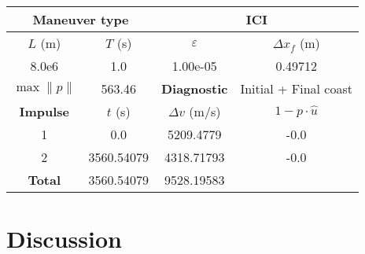     
\begin{table}[htpb]
    \centering
    \begin{tabular}{cccc} \toprule
    \multicolumn{2}{c}{\textbf{Maneuver type}} & \multicolumn{2}{c}{ICI} \\ \midrule
    \(L\) (m) & \(T\) (s) & \(\varepsilon\) & \(\Delta x_{f}\) (m)    \\ \midrule
    8.0e6          & 1.0          & 1.00e-05                & 0.49712                        \\ \midrule
    \(\max \lVert p \rVert\) & 563.46     & \textbf{Diagnostic}   & Initial + Final coast        \\ \midrule
    \textbf{Impulse} & \(t\) (s) & \(\Delta v\) (m/s) & \(1 - p \cdot \hat{u}\) \\ \midrule
    1                 & 0.0          & 5209.4779             & -0.0                    \\
    2                 & 3560.54079          & 4318.71793             & -0.0                    \\\midrule
    \textbf{Total}   & 3560.54079          & 9528.19583             &                     \\ \bottomrule   
    \end{tabular}
\end{table}

\section{Discussion}